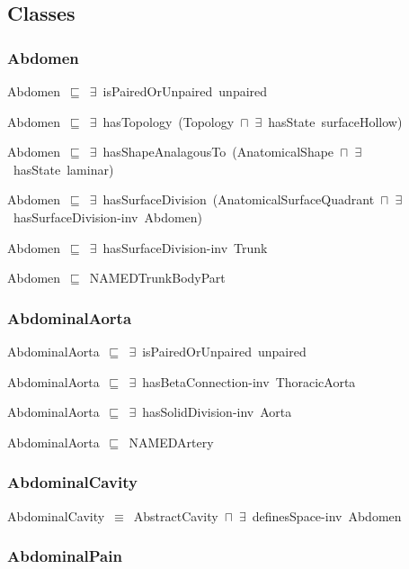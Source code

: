 \documentclass{article}
\begin{document}
\subsection*{Classes}

\subsubsection*{Abdomen}

Abdomen~\ensuremath{\sqsubseteq}~\ensuremath{\exists}~isPairedOrUnpaired~unpaired~

Abdomen~\ensuremath{\sqsubseteq}~\ensuremath{\exists}~hasTopology~(Topology~\ensuremath{\sqcap}~\ensuremath{\exists}~hasState~surfaceHollow)~

Abdomen~\ensuremath{\sqsubseteq}~\ensuremath{\exists}~hasShapeAnalagousTo~(AnatomicalShape~\ensuremath{\sqcap}~\ensuremath{\exists}~hasState~laminar)~

Abdomen~\ensuremath{\sqsubseteq}~\ensuremath{\exists}~hasSurfaceDivision~(AnatomicalSurfaceQuadrant~\ensuremath{\sqcap}~\ensuremath{\exists}~hasSurfaceDivision-inv~Abdomen)~

Abdomen~\ensuremath{\sqsubseteq}~\ensuremath{\exists}~hasSurfaceDivision-inv~Trunk~

Abdomen~\ensuremath{\sqsubseteq}~NAMEDTrunkBodyPart~

\subsubsection*{AbdominalAorta}

AbdominalAorta~\ensuremath{\sqsubseteq}~\ensuremath{\exists}~isPairedOrUnpaired~unpaired~

AbdominalAorta~\ensuremath{\sqsubseteq}~\ensuremath{\exists}~hasBetaConnection-inv~ThoracicAorta~

AbdominalAorta~\ensuremath{\sqsubseteq}~\ensuremath{\exists}~hasSolidDivision-inv~Aorta~

AbdominalAorta~\ensuremath{\sqsubseteq}~NAMEDArtery~

\subsubsection*{AbdominalCavity}

AbdominalCavity~\ensuremath{\equiv}~AbstractCavity~\ensuremath{\sqcap}~\ensuremath{\exists}~definesSpace-inv~Abdomen

\subsubsection*{AbdominalPain}
\end{document}
